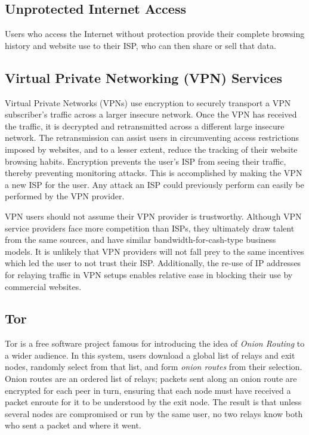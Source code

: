 
\subsection*{Unprotected Internet Access}

Users who access the Internet without protection provide their
complete browsing history and website use to their ISP, who can then share or sell that data.

\subsection*{Virtual Private Networking (VPN) Services}

Virtual Private Networks (VPNs) use encryption to securely transport a
VPN subscriber's traffic across a larger insecure network. Once the
VPN has received the traffic, it is decrypted and retransmitted across
a different large insecure network. The retransmission can assist
users in circumventing access restrictions imposed by websites, and to
a lesser extent, reduce the tracking of their website browsing
habits. Encryption prevents the user's ISP from seeing their traffic,
thereby preventing monitoring attacks. This is accomplished by making
the VPN a new ISP for the user.  Any attack an ISP could previously
perform can easily be performed by the VPN provider.

VPN users should not assume their VPN provider is trustworthy. Although VPN service providers face more competition
than ISPs, they ultimately draw talent from the same sources, and have
similar bandwidth-for-cash-type business models. It is unlikely that
VPN providers will not fall prey to the same incentives which led the
user to not trust their ISP. Additionally, the re-use of IP addresses
for relaying traffic in VPN setups enables relative ease in blocking
their use by commercial websites\cite{13}.

\subsection*{Tor}

Tor\cite{TOR} is a free software project famous for introducing the
idea of \emph{Onion Routing} to a wider audience. In this system, users
download a global list of relays and exit nodes, randomly select from
that list, and form \emph{onion routes} from their selection. Onion
routes are an ordered list of relays; packets sent along an onion
route are encrypted for each peer in turn, ensuring that each node
must have received a packet enroute for it to be understood by the
exit node. The result is that unless several nodes are compromised or
run by the same user, no two relays know both who sent 
a packet and where it went.

